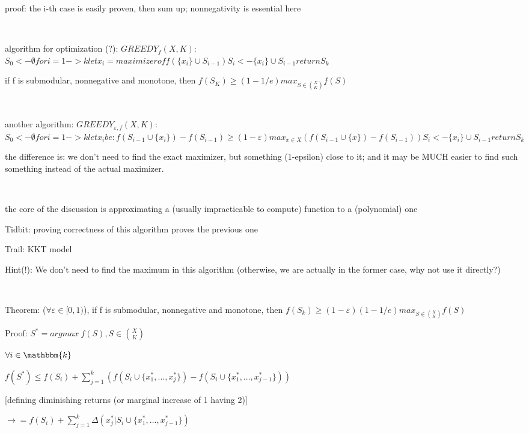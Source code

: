 \documentclass{report}
\begin{document}
	proof: the i-th case is easily proven, then sum up; nonnegativity is essential here
	
	\
	
	algorithm for optimization (?): $GREEDY_f(X, K)$:
	$
	S_0 <- \emptyset
	for i=1 -> k
		let x_i = maximizer of f(\{x_i\} \cup S_{i-1})
		S_i <- \{x_i\} \cup S_{i-1}		
	return S_k
	$
	
	if f is submodular, nonnegative and monotone, then $\displaystyle f(S_K)\geq(1-1/e)max_{S \in \binom{X}{K}}f(S)$
	
	\
	
	another algorithm: $GREEDY_{\varepsilon, f}(X, K)$:
	$
	S_0 <- \emptyset
	for i=1 -> k
		let x_i be : f(S_{i-1} \cup \{x_i\}) - f(S_{i-1}) \geq (1-\varepsilon)max_{x \in X} (f(S_{i-1} \cup \{x\}) - f(S_{i-1})) %
		S_i <- \{x_i\} \cup S_{i-1}		
	return S_k
	$
	
	the difference is: we don't need to find the exact maximizer, but something (1-epsilon) close to it; and it may be MUCH easier to find such something instead of the actual maximizer.
	
	\
	
	the core of the discussion is approximating a (usually impracticable to compute) function to a (polynomial) one
	
	Tidbit: proving correctness of this algorithm proves the previous one
	
	Trail: KKT model
	
	Hint(!): We don't need to find the maximum in this algorithm (otherwise, we are actually in the former case, why not use it directly?)
	
	\
	
	Theorem: ($\forall \varepsilon \in [0, 1)$), if f is submodular, nonnegative and monotone, then $f(S_k) \geq (1-\varepsilon)(1-1/e)max_{S \in \binom{X}{K}}f(S)$

	Proof: $S^* = argmax\ f(S), S \in \binom{X}{K}$
	
	$\forall i \in \mathbbm{k}$
	
	$f(S^*) \leq f(S_i) + \sum_{j=1}^{k}(f(S_i \cup\{x_1^*, ..., x_j^*\})-f(S_i \cup\{x_1^*, ..., x_{j-1}^*\}))$
	
	[defining diminishing returns (or marginal increase of {1} having {2})]
	
	$\to = f(S_i)+ \sum_{j=1}^{k}\Delta(x_j^* | S_i \cup \{x_1^*, ..., x_{j-1}^*\})$
	
\end{document}
